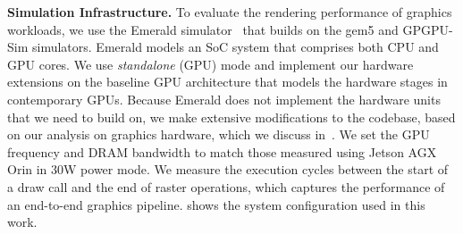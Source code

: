 
\begin{table}[t]
  \centering
  \caption{Simulation configuration.}
  \label{tab:sys-config}
\end{table}


\noindent\textbf{Simulation Infrastructure.}
%
To evaluate the rendering performance of graphics workloads, we use the Emerald
simulator~\cite{gub:aam19} that builds on the gem5 and GPGPU-Sim simulators. 
%
Emerald models an SoC system that comprises both CPU and GPU cores.
%
We use \emph{standalone} (GPU) mode and implement our hardware extensions on
the baseline GPU architecture that models the hardware stages in contemporary
GPUs.
%
Because Emerald does not implement the hardware units that we need to build on,
we make extensive modifications to the codebase, based on our analysis on
graphics hardware, which we discuss in~.
%
We set the GPU frequency and DRAM bandwidth to match those measured using
Jetson AGX Orin in 30W power mode.
%
We measure the execution cycles between the start of a draw call and the end of
raster operations, which captures the performance of an end-to-end graphics
pipeline.
%
 shows the system configuration used in this work.

